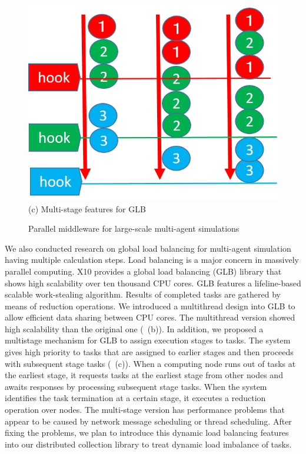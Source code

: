 \begin{figure}
\begin{minipage}{.3\textwidth}
      \includegraphics[width=\textwidth]{Figs.kamada/msGLB.png}
      (c) Multi-stage features for GLB
    \end{minipage}
  \caption{Parallel middleware for large-scale multi-agent simulations}
  \label{fig:Figs.kamada/middleware}
\end{figure}


We also conducted research on global load balancing for
 multi-agent simulation having multiple calculation steps.
Load balancing is a major concern in massively parallel computing.
X10 provides a global load balancing (GLB) library that 
shows high scalability over ten thousand CPU cores.
GLB features a lifeline-based scalable work-stealing algorithm.
Results of completed tasks are gathered by means of reduction operations.
We introduced a multithread design into GLB 
to allow efficient data sharing between CPU cores.
The multithread version showed high scalability than the original one (~(b)).
In addition, we proposed a multistage mechanism for GLB to 
assign execution stages to tasks.
The system gives high priority to tasks that are assigned to earlier stages
and then proceeds with subsequent stage tasks (~(c)).
When a computing node runs out of tasks at the earliest stage,
it requests tasks at the earliest stage from other nodes
and awaits responses by processing subsequent stage tasks.
When the system identifies the task termination at a certain stage,
it executes a reduction operation over nodes.
The multi-stage version has performance problems
that appear to be caused by network message scheduling or thread scheduling.
After fixing the problems,
we plan to introduce this dynamic load balancing features into our distributed collection library
to treat dynamic load imbalance of tasks.









